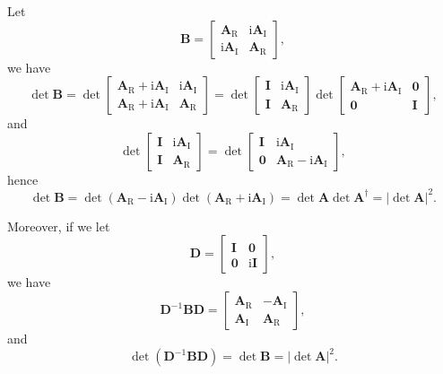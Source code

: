 \documentclass[a4paper,11pt,twoside,openright]{book}
\begin{document}
Let
\begin{equation}
  \mathbf{B}=\begin{bmatrix}
    \mathbf{A}_{\text{R}} & \text{i}\mathbf{A}_{\text{I}}\\
    \text{i}\mathbf{A}_{\text{I}} & \mathbf{A}_{\text{R}}
  \end{bmatrix},
\end{equation}
we have
\begin{equation}
  \det\mathbf{B}=\det\begin{bmatrix}
    \mathbf{A}_{\text{R}}+\text{i}\mathbf{A}_{\text{I}} & \text{i}\mathbf{A}_{\text{I}}\\
    \mathbf{A}_{\text{R}}+\text{i}\mathbf{A}_{\text{I}} & \mathbf{A}_{\text{R}}
  \end{bmatrix}
  =\det\begin{bmatrix}
    \mathbf{I} & \text{i}\mathbf{A}_{\text{I}}\\
    \mathbf{I} & \mathbf{A}_{\text{R}}
  \end{bmatrix}
  \det\begin{bmatrix}
    \mathbf{A}_{\text{R}}+\text{i}\mathbf{A}_{\text{I}} & \mathbf{0}\\
    \mathbf{0} & \mathbf{I}
  \end{bmatrix},
\end{equation}
and
\begin{equation}
  \det\begin{bmatrix}
    \mathbf{I} & \text{i}\mathbf{A}_{\text{I}}\\
    \mathbf{I} & \mathbf{A}_{\text{R}}
  \end{bmatrix}
  =\det\begin{bmatrix}
    \mathbf{I} & \text{i}\mathbf{A}_{\text{I}}\\
    \mathbf{0} & \mathbf{A}_{\text{R}}-\text{i}\mathbf{A}_{\text{I}}
  \end{bmatrix},
\end{equation}
hence
\begin{equation}
  \det\mathbf{B}=\det(\mathbf{A}_{\text{R}}-\text{i}\mathbf{A}_{\text{I}})
    \det(\mathbf{A}_{\text{R}}+\text{i}\mathbf{A}_{\text{I}})
  =\det\mathbf{A}\det\mathbf{A}^{\dagger}=|\det\mathbf{A}|^{2}.
\end{equation}

Moreover, if we let
\begin{equation}
  \mathbf{D}=\begin{bmatrix}
    \mathbf{I} & \mathbf{0}\\
    \mathbf{0} & \text{i}\mathbf{I}
  \end{bmatrix},
\end{equation}
we have
\begin{equation}
  \mathbf{D}^{-1}\mathbf{B}\mathbf{D}=\begin{bmatrix}
    \mathbf{A}_{\text{R}} & -\mathbf{A}_{\text{I}}\\
    \mathbf{A}_{\text{I}} & \mathbf{A}_{\text{R}}
  \end{bmatrix},
\end{equation}
and
\begin{equation}
  \det(\mathbf{D}^{-1}\mathbf{B}\mathbf{D})=\det\mathbf{B}=|\det\mathbf{A}|^{2}.
\end{equation}
\end{document}
